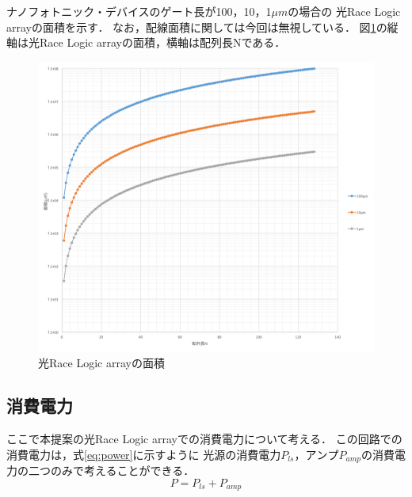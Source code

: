 ナノフォトニック・デバイスのゲート長が100，10，1$\mu m$の場合の
光Race Logic arrayの面積を示す．
なお，配線面積に関しては今回は無視している．
図\ref{fig:nanoArea}の縦軸は光Race Logic arrayの面積，横軸は配列長Nである．
\begin{figure}[t!]
\begin{center}
\includegraphics[keepaspectratio,scale=0.5]{fig/4/nanoArea.png}
\caption{光Race Logic arrayの面積}
\label{fig:nanoArea}
\end{center}
\end{figure}

\subsection{消費電力}
ここで本提案の光Race Logic arrayでの消費電力について考える．
この回路での消費電力は，式\ref{eq:power}に示すように
$光源の消費電力P_{ls}$，$アンプP_{amp}$の消費電力の二つのみで考えることができる．
\begin{equation}
P=P_{ls}+P_{amp}
\label{eq:power}
\end{equation}

